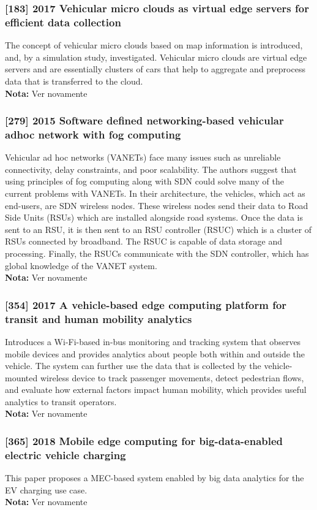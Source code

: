 \subsubsection{[183] 2017 Vehicular micro clouds as virtual edge servers for efficient data collection}
The concept of vehicular micro clouds based on map information is introduced, and, by a simulation study, investigated. Vehicular micro clouds are virtual edge servers and are essentially clusters of cars that help to aggregate and preprocess data that is transferred to the cloud.\\
\textbf{Nota:} Ver novamente

\subsubsection{[279] 2015 Software defined networking-based vehicular adhoc network with fog computing}
Vehicular ad hoc networks (VANETs) face many issues such as unreliable connectivity, delay constraints, and poor scalability. The authors suggest that using principles of fog computing along with SDN could solve many of the current problems with VANETs. In their architecture, the vehicles, which act as end-users, are SDN wireless nodes. These wireless nodes send their data to Road Side Units (RSUs) which are installed alongside road systems. Once the data is sent to an RSU, it is then sent to an RSU controller (RSUC) which is a cluster of RSUs connected by broadband. The RSUC is capable of data storage and processing. Finally, the RSUCs communicate with the SDN controller, which has global knowledge of the VANET system.\\
\textbf{Nota:} Ver novamente

\subsubsection{[354] 2017 A vehicle-based edge computing platform for transit and human mobility analytics}
Introduces a Wi-Fi-based in-bus monitoring and tracking system that observes mobile devices and provides analytics about people both within and outside the vehicle. The system can further use the data that is collected by the vehicle-mounted wireless device to track passenger movements, detect pedestrian flows, and evaluate how external factors impact human mobility, which provides useful analytics to transit operators.\\
\textbf{Nota:} Ver novamente

\subsubsection{[365] 2018 Mobile edge computing for big-data-enabled electric vehicle charging}
This paper proposes a MEC-based system enabled by big data analytics for the EV charging use case.\\
\textbf{Nota:} Ver novamente


